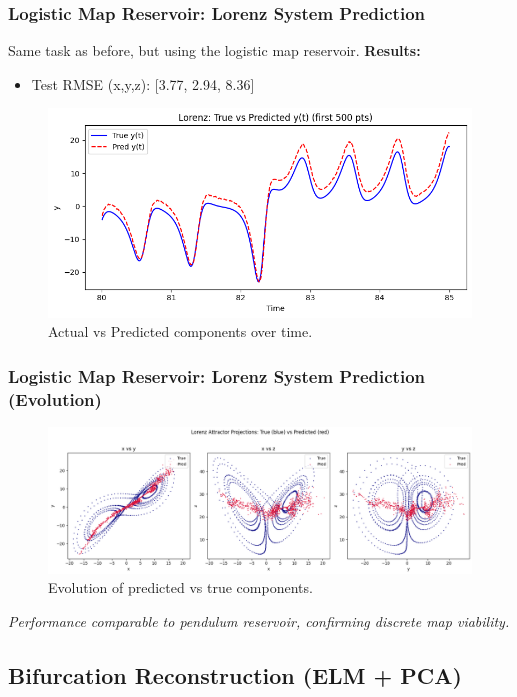 \documentclass{beamer}
\begin{document}
\begin{frame}
    \frametitle{Logistic Map Reservoir: Lorenz System Prediction}
    Same task as before, but using the logistic map reservoir.
    \textbf{Results:}
    \begin{itemize}
        \item Test RMSE (x,y,z): [3.77, 2.94, 8.36]
    \end{itemize}
    \begin{figure}
        \includegraphics[width=0.9\linewidth]{figures/lorentz_logistic_pred_true.png}
        \caption{Actual vs Predicted components over time.}
        \label{fig:logistic_map_lorenz_slide}
    \end{figure}
\end{frame}

\begin{frame}
    \frametitle{Logistic Map Reservoir: Lorenz System Prediction (Evolution)}
     \begin{figure}
        \centering
        \includegraphics[width=0.9\linewidth]{figures/lorenz_logistic_pred_diagram.png}
        \caption{Evolution of predicted vs true components.}
        \label{fig:logistic_map_lorenz_diag_slide}
    \end{figure}
    \textit{Performance comparable to pendulum reservoir, confirming discrete map viability.}
\end{frame}


\subsection{Bifurcation Reconstruction (ELM + PCA)}
\end{document}
